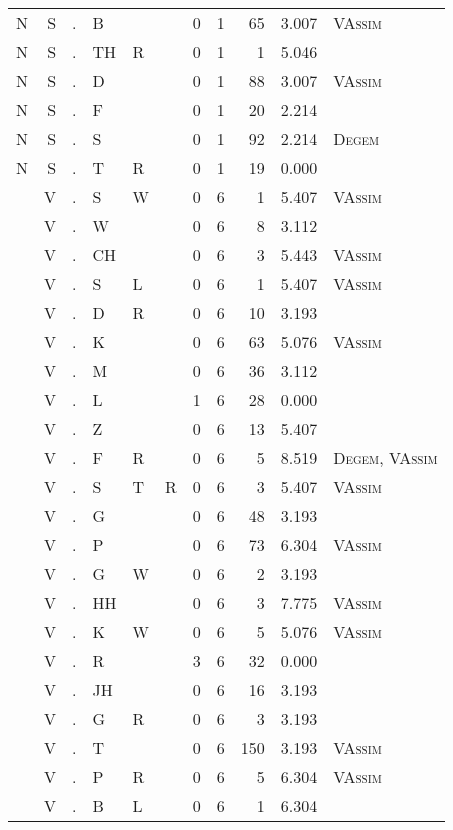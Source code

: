 \begin{longtable}{r@{ } r@{ } c@{ } l@{ } l@{ } l@{ } r r r r l }
N & S & . & B &  &  & 0 & 1 & 65 & 3.007 & \textsc{VAssim} \\
N & S & . & TH & R &  & 0 & 1 & 1 & 5.046 &  \\
N & S & . & D &  &  & 0 & 1 & 88 & 3.007 & \textsc{VAssim} \\
N & S & . & F &  &  & 0 & 1 & 20 & 2.214 &  \\
N & S & . & S &  &  & 0 & 1 & 92 & 2.214 & \textsc{Degem} \\
N & S & . & T & R &  & 0 & 1 & 19 & 0.000 &  \\
 & V & . & S & W &  & 0 & 6 & 1 & 5.407 & \textsc{VAssim} \\
 & V & . & W &  &  & 0 & 6 & 8 & 3.112 &  \\
 & V & . & CH &  &  & 0 & 6 & 3 & 5.443 & \textsc{VAssim} \\
 & V & . & S & L &  & 0 & 6 & 1 & 5.407 & \textsc{VAssim} \\
 & V & . & D & R &  & 0 & 6 & 10 & 3.193 &  \\
 & V & . & K &  &  & 0 & 6 & 63 & 5.076 & \textsc{VAssim} \\
 & V & . & M &  &  & 0 & 6 & 36 & 3.112 &  \\
 & V & . & L &  &  & 1 & 6 & 28 & 0.000 &  \\
 & V & . & Z &  &  & 0 & 6 & 13 & 5.407 &  \\
 & V & . & F & R &  & 0 & 6 & 5 & 8.519 & \textsc{Degem}, \textsc{VAssim} \\
 & V & . & S & T & R & 0 & 6 & 3 & 5.407 & \textsc{VAssim} \\
 & V & . & G &  &  & 0 & 6 & 48 & 3.193 &  \\
 & V & . & P &  &  & 0 & 6 & 73 & 6.304 & \textsc{VAssim} \\
 & V & . & G & W &  & 0 & 6 & 2 & 3.193 &  \\
 & V & . & HH &  &  & 0 & 6 & 3 & 7.775 & \textsc{VAssim} \\
 & V & . & K & W &  & 0 & 6 & 5 & 5.076 & \textsc{VAssim} \\
 & V & . & R &  &  & 3 & 6 & 32 & 0.000 &  \\
 & V & . & JH &  &  & 0 & 6 & 16 & 3.193 &  \\
 & V & . & G & R &  & 0 & 6 & 3 & 3.193 &  \\
 & V & . & T &  &  & 0 & 6 & 150 & 3.193 & \textsc{VAssim} \\
 & V & . & P & R &  & 0 & 6 & 5 & 6.304 & \textsc{VAssim} \\
 & V & . & B & L &  & 0 & 6 & 1 & 6.304 &  \\

\end{longtable}
